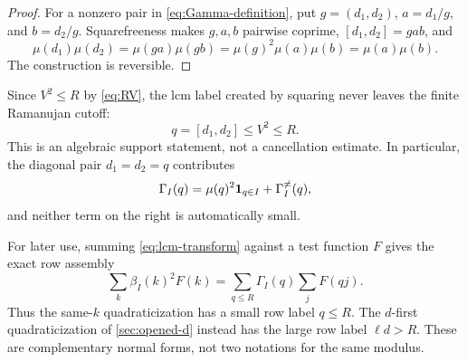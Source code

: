 \begin{proof}
For a nonzero pair in \eqref{eq:Gamma-definition}, put
$g=(d_1,d_2)$, $a=d_1/g$, and $b=d_2/g$.  Squarefreeness makes
$g,a,b$ pairwise coprime, $[d_1,d_2]=gab$, and
\[
 \mu(d_1)\mu(d_2)
 =\mu(ga)\mu(gb)=\mu(g)^2\mu(a)\mu(b)=\mu(a)\mu(b).
\]
The construction is reversible.
\end{proof}

Since $V^2\le R$ by \eqref{eq:RV}, the lcm label created by squaring
never leaves the finite Ramanujan cutoff:
\begin{equation}
 \boxed{\quad q=[d_1,d_2]\le V^2\le R.\quad}
 \label{eq:cutoff-return}
\end{equation}
This is an algebraic support statement, not a cancellation estimate.
In particular, the diagonal pair $d_1=d_2=q$ contributes
\begin{equation}
 \Gamma_I(q)=\mu(q)^2\mathbf 1_{q\in I}+\Gamma_I^{\ne}(q),
 \label{eq:Gamma-divisor-diagonal}
\end{equation}
and neither term on the right is automatically small.

For later use, summing \eqref{eq:lcm-transform} against a test function
$F$ gives the exact row assembly
\begin{equation}
 \sum_k\beta_I(k)^2F(k)
 =\sum_{q\le R}\Gamma_I(q)\sum_jF(qj).
 \label{eq:lcm-row-assembly}
\end{equation}
Thus the same-$k$ quadraticization has a small row label $q\le R$.
The $d$-first quadraticization of \cref{sec:opened-d} instead has the
large row label $\ell d>R$.  These are complementary normal forms, not
two notations for the same modulus.
